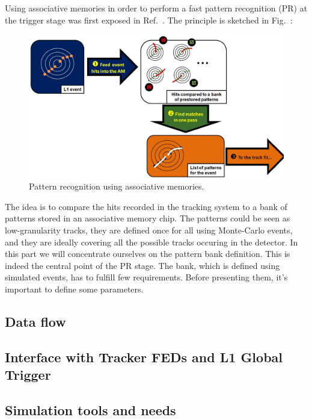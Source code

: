 \noindent Using associative memories in order to perform a fast pattern recognition (PR) at the trigger stage was first exposed in Ref.~\cite{bib:Del-89}. The principle is sketched in Fig.~\cite{fig:AM_principle}:
\begin{figure}[ht!]
\centering
\includegraphics[width=0.7\columnwidth]{Plots/TriggerAM.eps}
\caption{Pattern recognition using associative memories.}
\label{fig:AM_principle}
\end{figure}

\noindent The idea is to compare the hits recorded in the tracking system to a bank of patterns stored in an associative memory chip. The patterns could be seen as low-granularity tracks, they are defined once for all using Monte-Carlo events, and they are ideally covering all the possible tracks occuring in the detector. In this part we will concentrate ourselves on the pattern bank definition. This is indeed the central point of the PR stage. The bank, which is defined using simulated events, has to fulfill few requirements. Before presenting them, it's important to define some parameters. 

\subsection{Data flow}

\subsection{Interface with Tracker FEDs and L1 Global Trigger}

\subsection{Simulation tools and needs}


\clearpage
